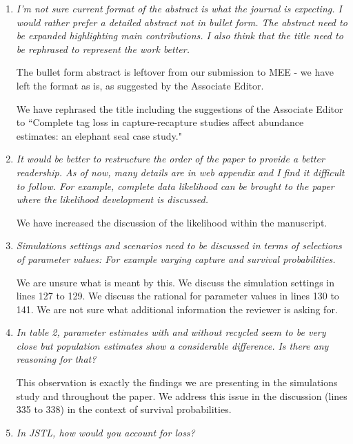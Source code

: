 \documentclass[12pt]{article}
\begin{document}
\bigskip

\begin{enumerate}
\item  {\it I'm not sure current format of the abstract is what the journal is expecting. I would rather prefer a detailed abstract not in bullet form. The abstract need to be expanded highlighting main contributions.   I also think that the title need to be rephrased to represent the work better. }

The bullet form abstract is leftover from our submission to MEE - we have left the format as is, as suggested by the Associate Editor.

We have rephrased the title including the suggestions of the Associate Editor to ``Complete tag loss in capture-recapture studies affect abundance estimates: an elephant seal case study."

\item {\it It would be better to restructure the order of the paper to provide a better readership. As of now, many details are in web appendix and I find it difficult to follow. For example, complete data likelihood can be brought to the paper where the likelihood development is discussed.}

We have increased the discussion of the likelihood within the manuscript.

\item {\it Simulations settings and scenarios need to be discussed in terms of selections of parameter values: For example varying capture and survival probabilities.}

We are unsure what is meant by this. We discuss the simulation settings in lines 127 to 129.  We discuss the rational for parameter values in lines 130 to 141.  We are not sure what additional information the reviewer is asking for.

\item {\it In table 2, parameter estimates with and without recycled seem to be very close but population estimates show a considerable difference. Is there any reasoning for that?}

This observation is exactly the findings we are presenting in the simulations study and throughout the paper.  We  address this issue in the discussion  (lines 335 to 338) in the context of survival probabilities.


\item {\it In JSTL, how would you account for loss?}


\end{enumerate}
\end{document}
